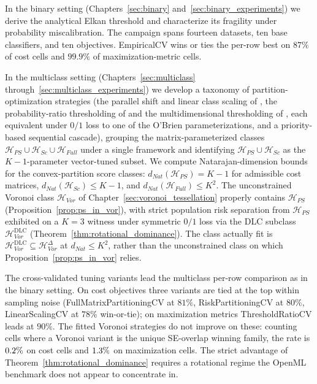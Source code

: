 In the binary setting (Chapters~\ref{sec:binary} and~\ref{sec:binary_experiments}) we derive the analytical Elkan threshold and characterize its fragility under probability miscalibration. The campaign spans fourteen datasets, ten base classifiers, and ten objectives. EmpiricalCV wins or ties the per-row best on $87\%$ of cost cells and $99.9\%$ of maximization-metric cells.

In the multiclass setting (Chapters~\ref{sec:multiclass} through~\ref{sec:multiclass_experiments}) we develop a taxonomy of partition-optimization strategies (the parallel shift and linear class scaling of \citet{obrien2008costsensitive}, the probability-ratio thresholding of \citet{lachiche2003improving} and the multidimensional thresholding of \citet{legnaro2025multiclass}, each equivalent under $0/1$ loss to one of the O'Brien parameterizations, and a priority-based sequential cascade), grouping the matrix-parameterized classes $\mathcal{H}_{PS} \cup \mathcal{H}_{Sc} \cup \mathcal{H}_{Full}$ under a single framework and identifying $\mathcal{H}_{PS} \cup \mathcal{H}_{Sc}$ as the $K-1$-parameter vector-tuned subset. We compute Natarajan-dimension bounds for the convex-partition score classes: $d_{Nat}(\mathcal{H}_{PS}) = K-1$ for admissible cost matrices, $d_{Nat}(\mathcal{H}_{Sc}) \leq K-1$, and $d_{Nat}(\mathcal{H}_{Full}) \leq K^2$. The unconstrained Voronoi class $\mathcal{H}_{Vor}$ of Chapter~\ref{sec:voronoi_tessellation} properly contains $\mathcal{H}_{PS}$ (Proposition~\ref{prop:ps_in_vor}), with strict population risk separation from $\mathcal{H}_{PS}$ exhibited on a $K{=}3$ witness under symmetric $0/1$ loss via the DLC subclass $\mathcal{H}_{Vor}^{\mathrm{DLC}}$ (Theorem~\ref{thm:rotational_dominance}). The class actually fit is $\mathcal{H}_{Vor}^{\mathrm{DLC}} \subseteq \mathcal{H}_{Vor}^{\Delta}$ at $d_{Nat} \leq K^2$, rather than the unconstrained class on which Proposition~\ref{prop:ps_in_vor} relies.

The cross-validated tuning variants lead the multiclass per-row comparison as in the binary setting. On cost objectives three variants are tied at the top within sampling noise (FullMatrixPartitioningCV at $81\%$, RiskPartitioningCV at $80\%$, LinearScalingCV at $78\%$ win-or-tie); on maximization metrics ThresholdRatioCV leads at $90\%$. The fitted Voronoi strategies do not improve on these: counting cells where a Voronoi variant is the unique SE-overlap winning family, the rate is $0.2\%$ on cost cells and $1.3\%$ on maximization cells. The strict advantage of Theorem~\ref{thm:rotational_dominance} requires a rotational regime the OpenML benchmark does not appear to concentrate in.

